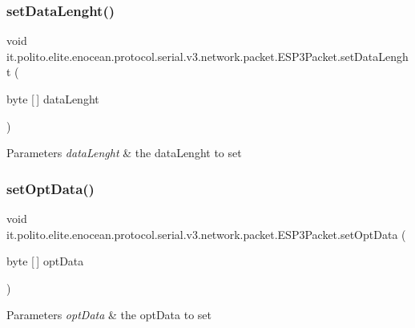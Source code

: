 \subsubsection{\texorpdfstring{set\+Data\+Lenght()}{setDataLenght()}}
{\footnotesize\ttfamily void it.\+polito.\+elite.\+enocean.\+protocol.\+serial.\+v3.\+network.\+packet.\+E\+S\+P3\+Packet.\+set\+Data\+Lenght (\begin{DoxyParamCaption}\item[{byte \mbox{[}$\,$\mbox{]}}]{data\+Lenght }\end{DoxyParamCaption})}


\begin{DoxyParams}{Parameters}
{\em data\+Lenght} & the data\+Lenght to set \\
\hline
\end{DoxyParams}
\hypertarget{classit_1_1polito_1_1elite_1_1enocean_1_1protocol_1_1serial_1_1v3_1_1network_1_1packet_1_1_e_s_p3_packet_aa6b0282e3456efdb9f01e8e01d876e3b}{}\label{classit_1_1polito_1_1elite_1_1enocean_1_1protocol_1_1serial_1_1v3_1_1network_1_1packet_1_1_e_s_p3_packet_aa6b0282e3456efdb9f01e8e01d876e3b} 
\subsubsection{\texorpdfstring{set\+Opt\+Data()}{setOptData()}}
{\footnotesize\ttfamily void it.\+polito.\+elite.\+enocean.\+protocol.\+serial.\+v3.\+network.\+packet.\+E\+S\+P3\+Packet.\+set\+Opt\+Data (\begin{DoxyParamCaption}\item[{byte \mbox{[}$\,$\mbox{]}}]{opt\+Data }\end{DoxyParamCaption})}


\begin{DoxyParams}{Parameters}
{\em opt\+Data} & the opt\+Data to set \\
\hline
\end{DoxyParams}
\hypertarget{classit_1_1polito_1_1elite_1_1enocean_1_1protocol_1_1serial_1_1v3_1_1network_1_1packet_1_1_e_s_p3_packet_a03b1b7f2ae2cdbe6c2e613fffe9f5c73}{}\label{classit_1_1polito_1_1elite_1_1enocean_1_1protocol_1_1serial_1_1v3_1_1network_1_1packet_1_1_e_s_p3_packet_a03b1b7f2ae2cdbe6c2e613fffe9f5c73} 
